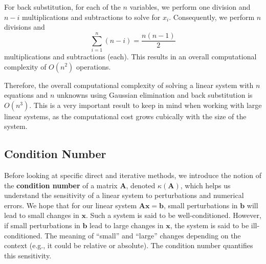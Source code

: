 For back substitution, for each of the $n$ variables, we perform one division and $n - i$ multiplications and subtractions to solve for $x_i$. Consequently, we perform $n$ divisions and
\begin{equation*}
    \sum_{i=1}^{n} (n - i) = \frac{n(n - 1)}{2}
\end{equation*}
multiplications and subtractions (each). This results in an overall computational complexity of $ O(n^2) $ operations.

Therefore, the overall computational complexity of solving a linear system with $n$ equations and $n$ unknowns using Gaussian elimination and back substitution is $ O(n^3) $. This is a very important result to keep in mind when working with large linear systems, as the computational cost grows cubically with the size of the system.


\subsection{Condition Number}
Before looking at specific direct and iterative methods, we introduce the notion of the \textbf{condition number} of a matrix $\mathbf{A}$, denoted $\kappa(\mathbf{A})$, which helps us understand the sensitivity of a linear system to perturbations and numerical errors. We hope that for our linear system $\mathbf{A}\mathbf{x} = \mathbf{b}$, small perturbations in $\mathbf{b}$ will lead to small changes in $\mathbf{x}$. Such a system is said to be well-conditioned. However, if small perturbations in $\mathbf{b}$ lead to large changes in $\mathbf{x}$, the system is said to be ill-conditioned. The meaning of ``small'' and ``large'' changes depending on the context (e.g., it could be relative or absolute). The condition number quantifies this sensitivity.

